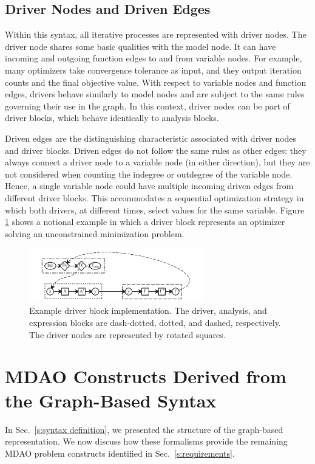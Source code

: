   \subsection{Driver Nodes and Driven Edges}
  Within this syntax, all iterative processes are represented with driver nodes. 
  The driver node shares some basic qualities with the model node. It can have incoming 
  and outgoing function edges to and from variable nodes. For example, many optimizers take 
  convergence tolerance as input, and they output iteration counts and the final objective value. 
  With respect to variable nodes and function edges, drivers behave similarly to
  model nodes and are subject to the same rules governing their use in the graph. In this
  context, driver nodes can be part of driver blocks, which behave identically to analysis 
  blocks. 

  Driven edges are the distinguishing characteristic associated with driver nodes and
  driver blocks. Driven edges do not follow the same rules as other edges: they  
   always connect a driver node to a variable node (in either direction), but they 
  are not considered when counting the indegree or outdegree of the variable node.
  Hence, a single variable node could have multiple incoming driven edges from different 
  driver blocks. This accommodates a sequential optimization strategy in which both drivers, at 
  different times, select values for the same variable. Figure \ref{f:driver block} shows 
  a notional example in which a driver block represents an optimizer solving an 
  unconstrained minimization problem. 

  \begin{figure}[htb]
    \begin{center}
    \includegraphics[width=3.0in]{images/driver_block}
    \end{center}
    \vspace{-10pt}
  \caption{Example driver block implementation. The driver, analysis, and expression blocks are dash-dotted, dotted, and dashed, respectively. The driver nodes are represented by rotated squares.}
  \label{f:driver block}
  \end{figure}


\section{MDAO Constructs Derived from the Graph-Based Syntax}
  \label{s:graph representation}
  In Sec.~\ref{s:syntax definition}, we presented the structure of the graph-based 
  representation. We now discuss how these formalisms provide the remaining MDAO problem 
  constructs identified in Sec.~\ref{s:requirements}.


